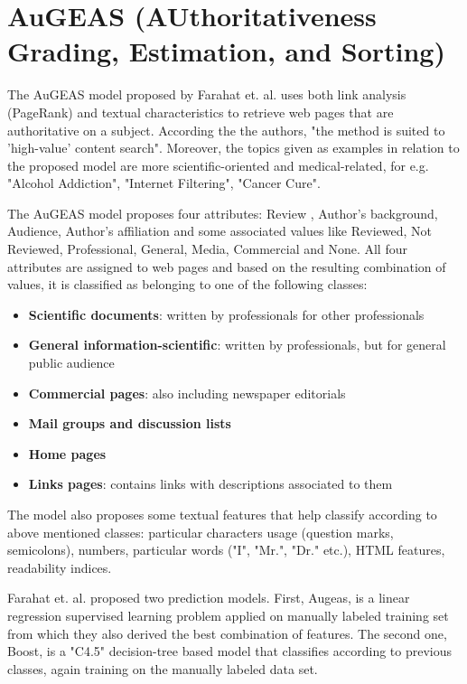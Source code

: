 \section{AuGEAS (AUthoritativeness Grading, Estimation, and Sorting)}

The AuGEAS\cite{augeas} model proposed by Farahat et. al. uses both link analysis (PageRank\cite{pagerank}) and textual characteristics to retrieve web pages that are authoritative on a subject. According the the authors, "the method is suited to 'high-value' content search". Moreover, the topics given as examples in relation to the proposed model are more scientific-oriented and medical-related, for e.g. "Alcohol Addiction", "Internet Filtering", "Cancer Cure".

The AuGEAS model proposes four attributes: Review , Author's background, Audience, Author's affiliation and some associated values like Reviewed, Not Reviewed, Professional, General, Media, Commercial and None. All four attributes are assigned to web pages and based on the resulting combination of values, it is classified as belonging to one of the following classes:
\begin{itemize}
	\item \textbf{Scientific documents}: written by professionals for other professionals
    \item \textbf{General information-scientific}: written by professionals, but for general public audience
    \item \textbf{Commercial pages}: also including newspaper editorials
    \item \textbf{Mail groups and discussion lists}
    \item \textbf{Home pages}
    \item \textbf{Links pages}: contains links with descriptions associated to them
\end{itemize}

The model also proposes some textual features that help classify according to above mentioned classes: particular characters usage (question marks, semicolons), numbers, particular words ("I", "Mr.", "Dr." etc.), HTML features, readability indices.

Farahat et. al. proposed two prediction models. First, Augeas, is a linear regression supervised learning problem applied on manually labeled training set from which they also derived the best combination of features. The second one, Boost, is a "C4.5" decision-tree based model that classifies according to previous classes, again training on the manually labeled data set.


